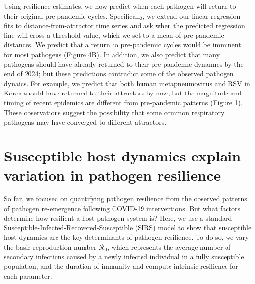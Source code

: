 \documentclass[12pt]{article}
\begin{document}
Using resilience estimates, we now predict when each pathogen will return to their original pre-pandemic cycles.
Specifically, we extend our linear regression fits to distance-from-attractor time series and ask when the predicted regression line will cross a threshold value, which we set to a mean of pre-pandemic distances.
We predict that a return to pre-pandemic cycles would be imminent for most pathogens (Figure 4B).
In addition, we also predict that many pathogens should have already returned to their pre-pandemic dynamics by the end of 2024; 
but these predictions contradict some of the observed pathogen dynaics.
For example, we predict that both human metapneumovirus and RSV in Korea should have returned to their attractors by now, but the magnitude and timing of recent epidemics are different from pre-pandemic patterns (Figure 1). 
These observations suggest the possibility that some common respiratory pathogens may have converged to different attractors.

\section*{Susceptible host dynamics explain variation in pathogen resilience}

So far, we focused on quantifying pathogen resilience from the observed patterns of pathogen re-emergence following COVID-19 interventions.
But what factors determine how resilient a host-pathogen system is?
Here, we use a standard Susceptible-Infected-Recovered-Susceptible (SIRS) model to show that susceptible host dynamics are the key determinants of pathogen resilience.
To do so, we vary the basic reproduction number $\mathcal R_0$, which represents the average number of secondary infections caused by a newly infected individual in a fully susceptible population, and the duration of immunity and compute intrinsic resilience for each parameter.
\end{document}
